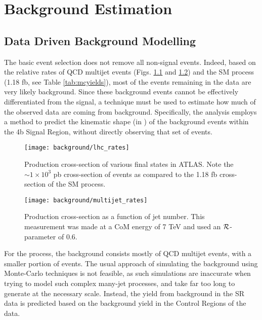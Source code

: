 \chapter{Background Estimation} \label{chapter:background}

\section{Data Driven Background Modelling}

    The basic event selection does not remove all non-signal events.
    Indeed, based on the relative rates of QCD multijet events
        (Figs. \ref{fig:lhc_rates} and \ref{fig:multijet_rates})
        and the SM \vbfhhproc process (1.18 fb, see Table \ref{tab:mcyields}),
        most of the events remaining in the data are very likely background.
    Since these background events cannot be effectively differentiated from the signal,
        a technique must be used to estimate how much of the observed data are coming from background.
    Specifically, the analysis employs a method to predict the kinematic shape (in \mhh)
        of the background events within the 4b Signal Region,
        without directly observing that set of events.

    \begin{figure}[tbh]
        \texttt{[image: background/lhc\_rates]}
        \caption{
            Production cross-section of various final states in ATLAS\cite{atlas_sm_summary}.
            Note the $\sim 1 \times 10^3$ pb cross-section of \ttbar events
                as compared to the 1.18 fb cross-section of the SM \vbfhhproc process.
        }
        \label{fig:lhc_rates}
    \end{figure}


    \begin{figure}[tbh]
        \texttt{[image: background/multijet\_rates]}
        \caption{
            Production cross-section as a function of jet number\cite{multijet_measurement}.
            This measurement was made at a CoM energy of 7 TeV and used an \antikt $\mathcal{R}$-parameter of 0.6.
        }
        \label{fig:multijet_rates}
    \end{figure}

    For the \vbfproc process, the background consists mostly of QCD multijet events,
        with a smaller portion of \ttbar events.
    The usual approach of simulating the background using Monte-Carlo techniques is not feasible,
        as such simulations are inaccurate when trying to model such complex many-jet processes,
        and take far too long to generate at the necessary scale.
    Instead, the yield from background in the SR data is predicted based on the background yield in the Control Regions of the data.
        
